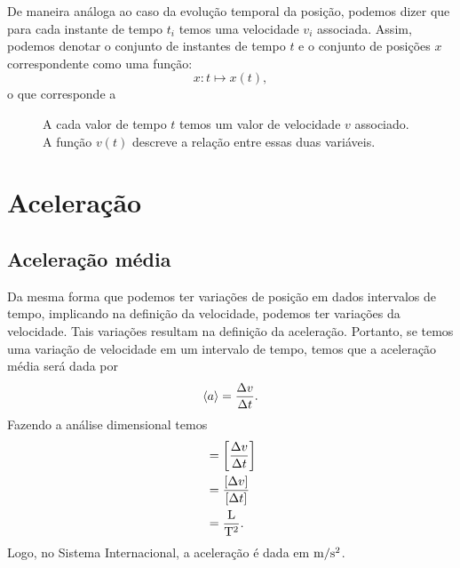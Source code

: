 De maneira análoga ao caso da evolução temporal da posição, podemos dizer que para cada instante de tempo $t_i$ temos uma velocidade $v_i$ associada. Assim, podemos denotar o conjunto de instantes de tempo $t$ e o conjunto de posições $x$ correspondente como uma função:
\begin{equation}
    x: t \mapsto x(t),
\end{equation}
%
o que corresponde a
\begin{figure}
\centering
{}
\caption{A cada valor de tempo $t$ temos um valor de velocidade $v$ associado. A função $v(t)$ descreve a relação entre essas duas variáveis.}
\end{figure}

\section{Aceleração}

\subsection{Aceleração média}

Da mesma forma que podemos ter variações de posição em dados intervalos de tempo, implicando na definição da velocidade, podemos ter variações da velocidade. Tais variações resultam na definição da aceleração. Portanto, se temos uma variação de velocidade em um intervalo de tempo, temos que a aceleração média será dada por
\begin{equation}
  \left\langle{a}\right\rangle = \frac{\Delta v}{\Delta t}.
\end{equation}
%
Fazendo a análise dimensional temos
\begin{align}
	[\mean{a}] &= \left[\frac{\Delta v}{\Delta t}\right] \\
		&= \frac{[\Delta v]}{[\Delta t]} \\
		&= \frac{\rm{L}}{\rm{T}^2}.
\end{align}
%
Logo, no Sistema Internacional, a aceleração é dada em $\rm{m}/\rm{s}^2$.

